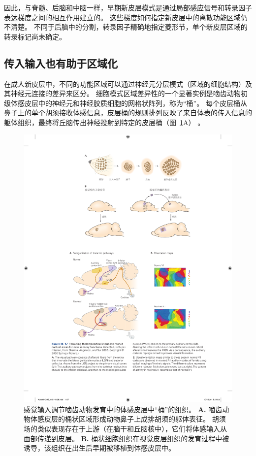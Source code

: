 因此，与脊髓、后脑和中脑一样，早期新皮层模式是通过局部感应信号和转录因子表达梯度之间的相互作用建立的。
这些梯度如何指定新皮层中的离散功能区域仍不清楚。
不同于后脑中的分割，转录因子精确地指定菱形节，单个新皮层区域的转录标记尚未确定。



\subsection{传入输入也有助于区域化}

在成人新皮层中，不同的功能区域可以通过神经元分层模式（区域的细胞结构）及其神经元连接的差异来区分。
细胞模式区域差异性的一个显著实例是啮齿动物初级体感皮层中的神经元和神经胶质细胞的网格状阵列，称为“桶”。
每个皮层桶从鼻子上的单个胡须接收体感信息，皮层桶的规则排列反映了来自体表的传入信息的躯体组织，最终将丘脑传出神经投射到特定的皮层桶（图~\ref{fig:45_16}A） 。


\begin{figure}[htbp]
	\centering
	\includegraphics[width=0.86\linewidth]{chap45/fig_45_16}
	\caption{感觉输入调节啮齿动物发育中的体感皮层中“桶”的组织\cite{schlaggar1991potential}。
		\textbf{A.} 啮齿动物体感皮层的桶状区域形成动物鼻子上成排胡须的躯体表征。
		胡须场的类似表现存在于上游（在脑干和丘脑核中），它们将体感输入从面部传递到皮层。
		\textbf{B.} 桶状细胞组织在视觉皮层组织的发育过程中被诱导，该组织在出生后早期被移植到体感皮层中。}
	\label{fig:45_16}
\end{figure}


